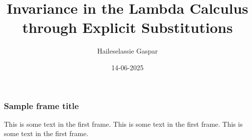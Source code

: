 \documentclass{beamer}
\title{Invariance in the Lambda Calculus through Explicit Substitutions}
\author{Haileselassie Gaspar}
\institute{Vrije Universiteit Amsterdam}
\date{14-06-2025}
\begin{document}
\frame{\titlepage}

\begin{frame}
\frametitle{Sample frame title}
This is some text in the first frame. This is some text in the first frame. This is some text in the first frame.
\end{frame}
\end{document}
